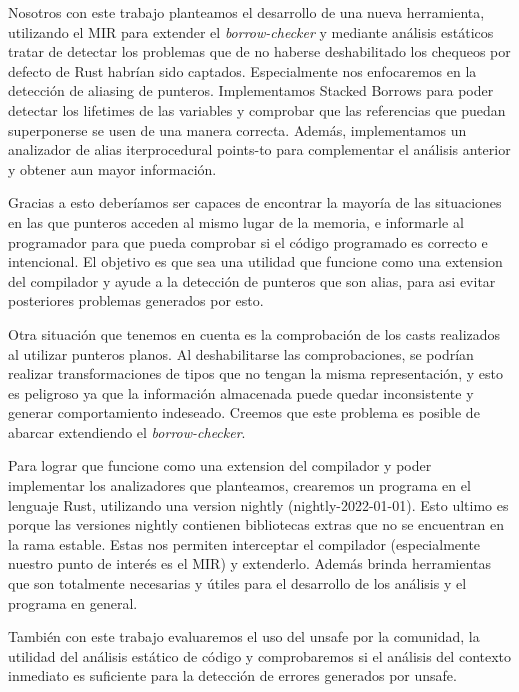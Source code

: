 Nosotros con este trabajo planteamos el desarrollo de una nueva herramienta, utilizando el MIR para extender el \textit{borrow-checker} y mediante análisis estáticos tratar de detectar los problemas que de no haberse deshabilitado los chequeos por defecto de Rust habrían sido captados. Especialmente nos enfocaremos en la detección de aliasing de punteros. Implementamos Stacked Borrows para poder detectar los lifetimes de las variables y comprobar que las referencias que puedan superponerse se usen de una manera correcta. Además, implementamos un analizador de alias iterprocedural points-to \cite{interprocedural} \cite{fastaliasinganalisis} para complementar el análisis anterior y obtener aun mayor información.

Gracias a esto deberíamos ser capaces de encontrar la mayoría de las situaciones en las que punteros acceden al mismo lugar de la memoria, e informarle al programador para que pueda comprobar si el código programado es correcto e intencional. El objetivo es que sea una utilidad que funcione como una extension del compilador y ayude a la detección de punteros que son alias, para asi evitar posteriores problemas generados por esto.

Otra situación que tenemos en cuenta es la comprobación de los casts realizados al utilizar punteros planos. Al deshabilitarse las comprobaciones, se podrían realizar transformaciones de tipos que no tengan la misma representación, y esto es peligroso ya que la información almacenada puede quedar inconsistente y generar comportamiento indeseado.
Creemos que este problema es posible de abarcar extendiendo el \textit{borrow-checker}.

Para lograr que funcione como una extension del compilador y poder implementar los analizadores que planteamos, crearemos un programa en el lenguaje Rust, utilizando una version nightly (nightly-2022-01-01). Esto ultimo es porque las versiones nightly contienen bibliotecas extras que no se encuentran en la rama estable. Estas nos permiten interceptar el compilador (especialmente nuestro punto de interés es el MIR) y extenderlo. Además brinda herramientas que son totalmente necesarias y útiles para el desarrollo de los análisis y el programa en general.

También con este trabajo evaluaremos el uso del unsafe por la comunidad, la utilidad del análisis estático de código y comprobaremos si el análisis del contexto inmediato es suficiente para la detección de errores generados por unsafe.







